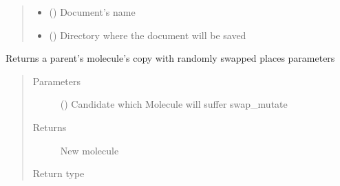 \documentclass[letterpaper,10pt,english]{sphinxmanual}
\begin{document}
\begin{fulllineitems}
\begin{fulllineitems}
\begin{quote}
\begin{description}
\begin{itemize}
\item {} 
\sphinxAtStartPar
{} () \textendash{} Document’s name

\item {} 
\sphinxAtStartPar
{} () \textendash{} Directory where the document will be saved

\end{itemize}

\end{description}\end{quote}

\end{fulllineitems}


\begin{fulllineitems}
\label{\detokenize{MolOpt:MolOpt.MolOpt.swap_mutate}}
\sphinxAtStartPar
Returns a parent’s molecule’s copy with randomly swapped places parameters
\begin{quote}\begin{description}
\item[{Parameters}] \leavevmode
\sphinxAtStartPar
{} ({\hyperref[\detokenize{genetic:genetic.Chromosome}]{}}) \textendash{} Candidate which Molecule will suffer swap\_mutate

\item[{Returns}] \leavevmode
\sphinxAtStartPar
New molecule

\item[{Return type}] \leavevmode
\sphinxAtStartPar
{\hyperref[\detokenize{molecular:molecular.Molecule}]{}}

\end{description}\end{quote}

\end{fulllineitems}


\end{fulllineitems}
\end{document}
